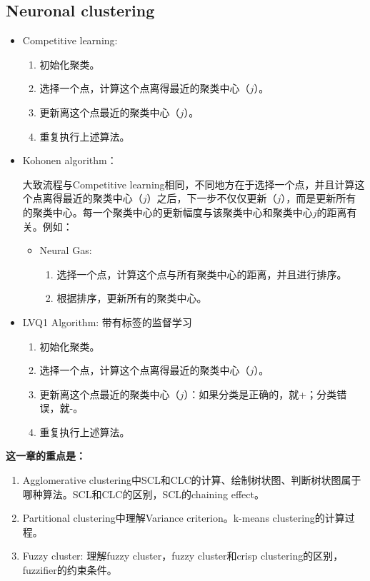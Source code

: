 \documentclass[12pt, a4paper, oneside]{ctexart}
\newenvironment{zd}{\begin{shaded}\par\noindent\textbf{这一章的重点是：}}{\end{shaded}\par}
\begin{document}
\subsection{Neuronal clustering}
\begin{itemize}
    \item Competitive learning:
    
    \begin{enumerate}
        \item 初始化聚类。
        \item 选择一个点，计算这个点离得最近的聚类中心（$j$）。
        \item 更新离这个点最近的聚类中心（$j$）。
        \item 重复执行上述算法。
    \end{enumerate}

    \item Kohonen algorithm：
    
    大致流程与Competitive learning相同，不同地方在于选择一个点，并且计算这个点离得最近的聚类中心（$j$）之后，下一步不仅仅更新（$j$），而是更新所有的聚类中心。每一个聚类中心的更新幅度与该聚类中心和聚类中心$j$的距离有关。例如：
    \begin{itemize}
        \item Neural Gas:
        
        \begin{enumerate}
            \item 选择一个点，计算这个点与所有聚类中心的距离，并且进行排序。
            \item 根据排序，更新所有的聚类中心。
        \end{enumerate}
    \end{itemize}

    \item LVQ1 Algorithm: 带有标签的监督学习
    \begin{enumerate}
        \item 初始化聚类。
        \item 选择一个点，计算这个点离得最近的聚类中心（$j$）。
        \item 更新离这个点最近的聚类中心（$j$）：如果分类是正确的，就+；分类错误，就-。
        \item 重复执行上述算法。
    \end{enumerate}  
\end{itemize}
\begin{zd}
    \begin{enumerate}
        \item Agglomerative clustering中SCL和CLC的计算、绘制树状图、判断树状图属于哪种算法。SCL和CLC的区别，SCL的chaining effect。
        \item Partitional clustering中理解Variance criterion。k-means clustering的计算过程。
        \item Fuzzy cluster: 理解fuzzy cluster，fuzzy cluster和crisp clustering的区别，fuzzifier的约束条件。
    \end{enumerate}
\end{zd}
\end{document}
